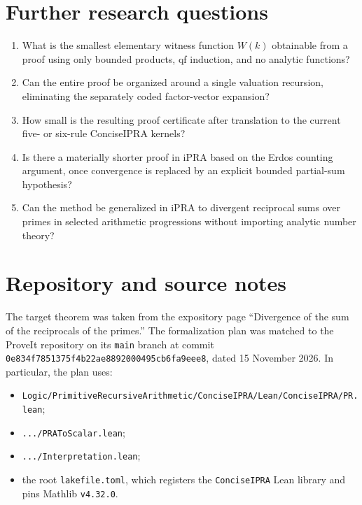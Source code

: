 \documentclass[11pt]{article}
\theoremstyle{definition}
\newcommand{\ipra}{\mathrm{iPRA}}
\newcommand{\code}[1]{\texttt{#1}}
\begin{document}
\section{Further research questions}

\begin{enumerate}
\item What is the smallest elementary witness function \(W(k)\) obtainable
      from a proof using only bounded products, qf induction, and no analytic
      functions?
\item Can the entire proof be organized around a single valuation recursion,
      eliminating the separately coded factor-vector expansion?
\item How small is the resulting proof certificate after translation to the
      current five- or six-rule ConciseIPRA kernels?
\item Is there a materially shorter proof in \(\ipra\) based on the Erdos
      counting argument, once convergence is replaced by an explicit bounded
      partial-sum hypothesis?
\item Can the method be generalized in \(\ipra\) to divergent reciprocal sums
      over primes in selected arithmetic progressions without importing
      analytic number theory?
\end{enumerate}

\section*{Repository and source notes}

The target theorem was taken from the expository page ``Divergence of the sum
of the reciprocals of the primes.''  The formalization plan was matched to the
ProveIt repository on its \code{main} branch at commit
\code{0e834f7851375f4b22ae8892000495cb6fa9eee8}, dated 15 November 2026.
In particular, the plan uses:
\begin{itemize}
\item \code{Logic/PrimitiveRecursiveArithmetic/ConciseIPRA/Lean/ConciseIPRA/PR.lean};
\item \code{.../PRAToScalar.lean};
\item \code{.../Interpretation.lean};
\item the root \code{lakefile.toml}, which registers the \code{ConciseIPRA}
      Lean library and pins Mathlib \code{v4.32.0}.
\end{itemize}
\end{document}
